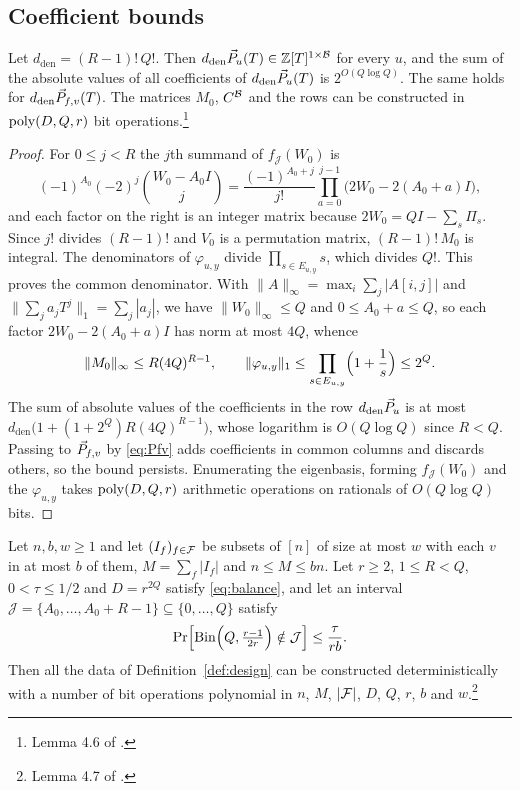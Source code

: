 \subsection{Coefficient bounds}
\begin{lemma}\label{lem:coeff}
Let $d_{\mathrm{den}}=(R-1)!\,Q!$. Then $d_{\mathrm{den}}\vec{P}_u(T)\in\mathbb{Z}[T]^{1\times\mathcal{B}}$
for every $u$, and the sum of the absolute values of all coefficients of
$d_{\mathrm{den}}\vec{P}_u(T)$ is $2^{O(Q\log Q)}$. The same holds for
$d_{\mathrm{den}}\vec{P}_{f,v}(T)$. The matrices $M_0$, $C^{\mathcal{B}}$ and the rows can be
constructed in $\operatorname{poly}(D,Q,r)$ bit operations.\footnote{Lemma 4.6 of
\cite{OAI26}.}
\end{lemma}

\begin{proof}
For $0\le j<R$ the $j$th summand of $f_{\mathcal J}(W_0)$ is
\[
  (-1)^{A_0}(-2)^j\binom{W_0-A_0I}{j}=\frac{(-1)^{A_0+j}}{j!}\prod_{a=0}^{j-1}\bigl(2W_0-2(A_0+a)I\bigr),
\]
and each factor on the right is an integer matrix because
$2W_0=QI-\sum_s\Pi_s$. Since $j!$ divides $(R-1)!$ and $V_0$ is a permutation
matrix, $(R-1)!\,M_0$ is integral. The denominators of $\varphi_{u,y}$ divide
$\prod_{s\in E_{u,y}}s$, which divides $Q!$. This proves the common denominator.
With $\|A\|_\infty=\max_i\sum_j|A[i,j]|$ and $\|\sum_ja_jT^j\|_1=\sum_j|a_j|$,
we have $\|W_0\|_\infty\le Q$ and $0\le A_0+a\le Q$, so each factor
$2W_0-2(A_0+a)I$ has norm at most $4Q$, whence
\[
  \|M_0\|_\infty\le R(4Q)^{R-1},\qquad \|\varphi_{u,y}\|_1\le\prod_{s\in E_{u,y}}\Bigl(1+\frac1s\Bigr)\le 2^{Q}.
\]
The sum of absolute values of the coefficients in the row $d_{\mathrm{den}}\vec{P}_u$
is at most $d_{\mathrm{den}}\bigl(1+(1+2^Q)R(4Q)^{R-1}\bigr)$, whose logarithm is
$O(Q\log Q)$ since $R<Q$. Passing to $\vec{P}_{f,v}$ by \eqref{eq:Pfv} adds
coefficients in common columns and discards others, so the bound persists.
Enumerating the eigenbasis, forming $f_{\mathcal J}(W_0)$ and the $\varphi_{u,y}$
takes $\operatorname{poly}(D,Q,r)$ arithmetic operations on rationals of $O(Q\log Q)$ bits.
\end{proof}

\begin{lemma}\label{lem:complete}
Let $n,b,w\ge1$ and let $(I_f)_{f\in\mathcal{F}}$ be subsets of $[n]$ of size at most $w$
with each $v$ in at most $b$ of them, $M=\sum_f|I_f|$ and $n\le M\le bn$. Let
$r\ge2$, $1\le R<Q$, $0<\tau\le1/2$ and $D=r^{2Q}$ satisfy \eqref{eq:balance},
and let an interval $\mathcal J=\{A_0,\dots,A_0+R-1\}\subseteq\{0,\dots,Q\}$
satisfy
\begin{equation}\label{eq:tailreq}
  \Pr\Bigl[\operatorname{Bin}\Bigl(Q,\tfrac{r-1}{2r}\Bigr)\notin\mathcal J\Bigr]\le\frac{\tau}{rb}.
\end{equation}
Then all the data of Definition~\ref{def:design} can be constructed
deterministically with a number of bit operations polynomial in
$n$, $M$, $|\mathcal{F}|$, $D$, $Q$, $r$, $b$ and $w$.\footnote{Lemma 4.7
of \cite{OAI26}.}
\end{lemma}

